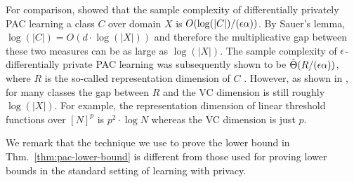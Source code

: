 \documentclass[final,12pt]{colt2018}
\begin{document}
For comparison, \citet{KasiviswanathanLNRS11} showed that the sample complexity of differentially privately PAC learning a class $C$ over domain $X$ is $O(\log(|C|)/(\epsilon\alpha))$. By Sauer's lemma, $\log(|C|) = O(d \cdot \log(|X|))$ and therefore the multiplicative gap between these two measures can be as large as $\log(|X|)$. The sample complexity of $\epsilon$-differentially private PAC learning was subsequently shown to be $\tilde{\Theta}(R/(\epsilon\alpha))$, where $R$ is the so-called representation dimension of $C$ \citep{BeimelNS:13}. However, as shown in \citep{FeldmanXiao15}, for many classes the gap between $R$ and the VC dimension is still roughly $\log(|X|)$. For example, the representation dimension of linear threshold functions over $[N]^p$ is $p^2 \cdot \log N$ whereas the VC dimension is just $p$.

We remark that the technique we use to prove the lower bound in Thm.~\ref{thm:pac-lower-bound} is different from those used for proving lower bounds in the standard setting of learning with privacy.
\end{document}
